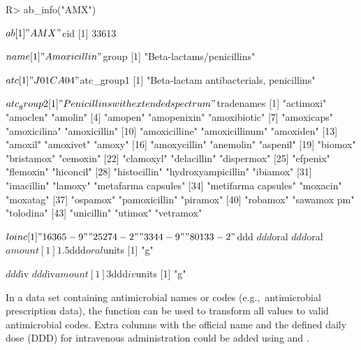 \documentclass[article, shortnames]{jss}
\newcommand{\fct}[1]{\code{#1()}}
\begin{document}
\begin{CodeChunk}
\begin{CodeInput}
R> ab_info("AMX")
\end{CodeInput}
\begin{CodeOutput}
$ab
[1] "AMX"

$cid
[1] 33613

$name
[1] "Amoxicillin"

$group
[1] "Beta-lactams/penicillins"

$atc
[1] "J01CA04"

$atc_group1
[1] "Beta-lactam antibacterials, penicillins"

$atc_group2
[1] "Penicillins with extended spectrum"

$tradenames
 [1] "actimoxi"           "amoclen"            "amolin"            
 [4] "amopen"             "amopenixin"         "amoxibiotic"       
 [7] "amoxicaps"          "amoxicilina"        "amoxicillin"       
[10] "amoxicilline"       "amoxicillinum"      "amoxiden"          
[13] "amoxil"             "amoxivet"           "amoxy"             
[16] "amoxycillin"        "anemolin"           "aspenil"           
[19] "biomox"             "bristamox"          "cemoxin"           
[22] "clamoxyl"           "delacillin"         "dispermox"         
[25] "efpenix"            "flemoxin"           "hiconcil"          
[28] "histocillin"        "hydroxyampicillin"  "ibiamox"           
[31] "imacillin"          "lamoxy"             "metafarma capsules"
[34] "metifarma capsules" "moxacin"            "moxatag"           
[37] "ospamox"            "pamoxicillin"       "piramox"           
[40] "robamox"            "sawamox pm"         "tolodina"          
[43] "unicillin"          "utimox"             "vetramox"          

$loinc
[1] "16365-9" "25274-2" "3344-9"  "80133-2"

$ddd
$ddd$oral
$ddd$oral$amount
[1] 1.5

$ddd$oral$units
[1] "g"


$ddd$iv
$ddd$iv$amount
[1] 3

$ddd$iv$units
[1] "g"
\end{CodeOutput}
\end{CodeChunk}
%
In a data set containing antimicrobial names or codes (e.g.,~antimicrobial
prescription data), the \fct{as.ab} function can be used to transform all
values to valid antimicrobial codes.  Extra columns with the official name
and the defined daily dose (DDD) for intravenous administration could be
added using \fct{ab\_name} and \fct{ab\_ddd}.
\end{document}
